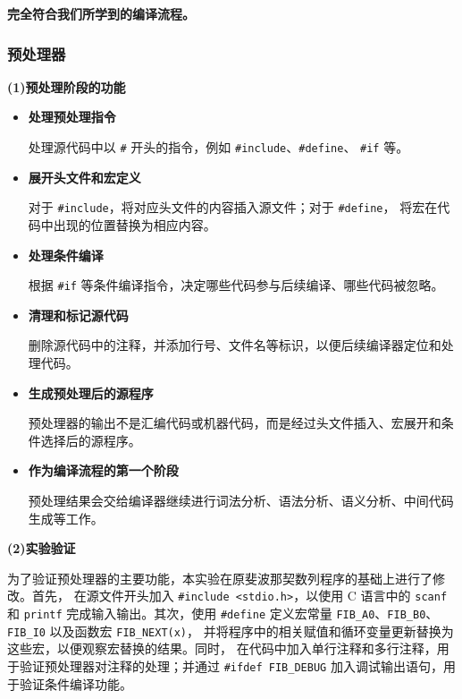 \documentclass[UTF8,a4paper,10pt]{ctexart}
\begin{document}
\textbf{完全符合我们所学到的编译流程。}

\subsubsection{预处理器}

\textbf{(1)预处理阶段的功能}
\begin{itemize}[leftmargin=*]
  \item \textbf{处理预处理指令}

  处理源代码中以 \verb|#| 开头的指令，例如 \verb|#include|、\verb|#define|、
  \verb|#if| 等。

  \item \textbf{展开头文件和宏定义}

  对于 \verb|#include|，将对应头文件的内容插入源文件；对于 \verb|#define|，
  将宏在代码中出现的位置替换为相应内容。

  \item \textbf{处理条件编译}

  根据 \verb|#if| 等条件编译指令，决定哪些代码参与后续编译、哪些代码被忽略。

  \item \textbf{清理和标记源代码}

  删除源代码中的注释，并添加行号、文件名等标识，以便后续编译器定位和处理代码。

  \item \textbf{生成预处理后的源程序}

  预处理器的输出不是汇编代码或机器代码，而是经过头文件插入、宏展开和条件选择后的源程序。

  \item \textbf{作为编译流程的第一个阶段}

  预处理结果会交给编译器继续进行词法分析、语法分析、语义分析、中间代码生成等工作。
  
\end{itemize}

\textbf{(2)实验验证}

为了验证预处理器的主要功能，本实验在原斐波那契数列程序的基础上进行了修改。首先，
在源文件开头加入 \verb|#include <stdio.h>|，以使用 C 语言中的 \verb|scanf| 和
\verb|printf| 完成输入输出。其次，使用 \verb|#define| 定义宏常量
\verb|FIB_A0|、\verb|FIB_B0|、\verb|FIB_I0| 以及函数宏 \verb|FIB_NEXT(x)|，
并将程序中的相关赋值和循环变量更新替换为这些宏，以便观察宏替换的结果。同时，
在代码中加入单行注释和多行注释，用于验证预处理器对注释的处理；并通过
\verb|#ifdef FIB_DEBUG| 加入调试输出语句，用于验证条件编译功能。
\end{document}
